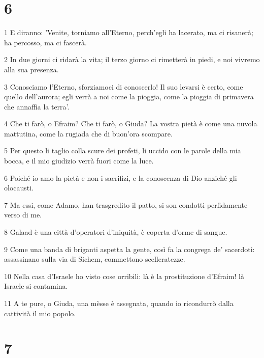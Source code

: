 \chapter{6}

\par 1 E diranno: 'Venite, torniamo all'Eterno, perch'egli ha lacerato, ma ci risanerà; ha percosso, ma ci fascerà.
\par 2 In due giorni ci ridarà la vita; il terzo giorno ci rimetterà in piedi, e noi vivremo alla sua presenza.
\par 3 Conosciamo l'Eterno, sforziamoci di conoscerlo! Il suo levarsi è certo, come quello dell'aurora; egli verrà a noi come la pioggia, come la pioggia di primavera che annaffia la terra'.
\par 4 Che ti farò, o Efraim? Che ti farò, o Giuda? La vostra pietà è come una nuvola mattutina, come la rugiada che di buon'ora scompare.
\par 5 Per questo li taglio colla scure dei profeti, li uccido con le parole della mia bocca, e il mio giudizio verrà fuori come la luce.
\par 6 Poiché io amo la pietà e non i sacrifizi, e la conoscenza di Dio anziché gli olocausti.
\par 7 Ma essi, come Adamo, han trasgredito il patto, si son condotti perfidamente verso di me.
\par 8 Galaad è una città d'operatori d'iniquità, è coperta d'orme di sangue.
\par 9 Come una banda di briganti aspetta la gente, così fa la congrega de' sacerdoti: assassinano sulla via di Sichem, commettono scelleratezze.
\par 10 Nella casa d'Israele ho visto cose orribili: là è la prostituzione d'Efraim! là Israele si contamina.
\par 11 A te pure, o Giuda, una mèsse è assegnata, quando io ricondurrò dalla cattività il mio popolo.

\chapter{7}

